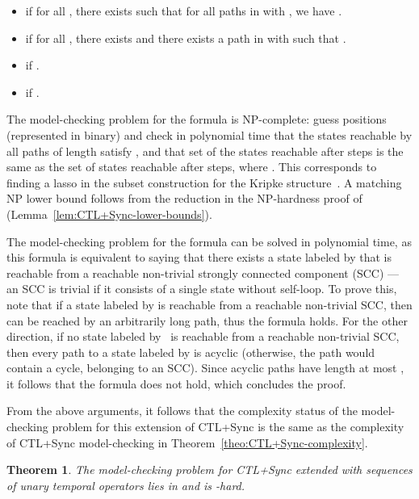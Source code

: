 \documentclass{article}
\newtheorem{theorem}{Theorem}
\begin{document}
\begin{itemize}
\item  if for all , there exists  
such that for all paths  in  with , we have .

\item  if for all , there exists  and
there exists a path  in  with  such that .





\item  if .

\item  if .
\end{itemize}


The model-checking problem for the formula  is NP-complete:
guess positions  (represented in binary) and 
check in polynomial time that the states reachable by all paths of length  satisfy ,
and that set of the states reachable after  steps is the same as the set
of states reachable after  steps, where . 
This corresponds to finding a lasso in the subset construction for the Kripke 
structure~. A matching NP lower bound follows from the reduction in the
NP-hardness proof of  (Lemma~\ref{lem:CTL+Sync-lower-bounds}).

The model-checking problem for the formula  can be solved
in polynomial time, as this formula is equivalent to saying that there exists
a state labeled by  that is reachable from a reachable non-trivial 
strongly connected component (SCC) --- an SCC is trivial if it consists of a single state without self-loop. 
To prove this, note that if a state  labeled by  is reachable 
from a reachable non-trivial SCC, then  can be reached by an arbitrarily 
long path, thus the formula  holds. For the other direction,
if no state labeled by~ is reachable from a reachable non-trivial SCC,
then every path to a state labeled by  is acyclic (otherwise, the path 
would contain a cycle, belonging to an SCC). Since acyclic paths have length at
most , it follows that the formula  does not
hold, which concludes the proof.

From the above arguments, it follows that the complexity status of the 
model-checking problem for this extension of CTL+Sync is the same as the 
complexity of CTL+Sync model-checking in Theorem~\ref{theo:CTL+Sync-complexity}.

\begin{theorem}\label{theo:CTL+Sync-extended-complexity}
The model-checking problem for CTL+Sync extended with sequences of unary 
temporal operators lies in  and is -hard.
\end{theorem}
\end{document}
